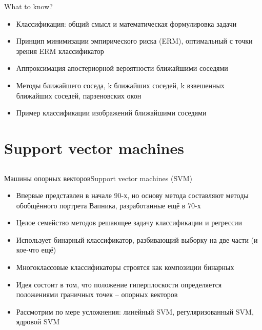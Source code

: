 \documentclass[red,unicode]{beamer}
\begin{document}
\begin{frame}{What to know?}
\begin{itemize}
	\item Классификация: общий смысл и математическая формулировка задачи
	\item Принцип минимизации эмпирического риска (ERM), оптимальный с точки зрения ERM классификатор
	\item Аппроксимация апостериорной вероятности ближайшими соседями
	\item Методы ближайшего соседа, k ближайших соседей, k взвешенных ближайших соседей, парзеновских окон
	\item Пример классификации изображений ближайшими соседями
\end{itemize}
\end{frame}

\section{Support vector machines}
\subsection{}



\begin{frame}{Машины опорных векторов}{Support vector machines (SVM)}
\begin{itemize}
	\item Впервые представлен в начале 90-х, но основу метода составляют методы обобщённого портрета Вапника, разработанные ещё в 70-х
	\item Целое семейство методов решающее задачу классификации и регрессии
	\item Использует бинарный классификатор, разбивающий выборку на две части (и кое-что ещё)
	\item Многоклассовые классификаторы строятся как композиции бинарных
	\item Идея состоит в том, что положение гиперплоскости определяется положениями граничных точек -- опорных векторов
	\item Рассмотрим по мере усложнения: линейный SVM, регуляризованный SVM, ядровой SVM
\end{itemize}
\end{frame}
\end{document}
